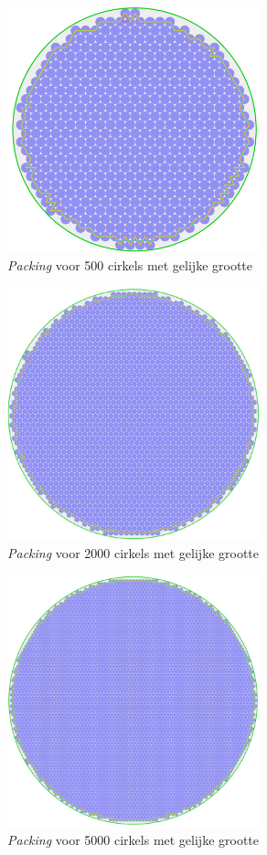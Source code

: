 \documentclass[12pt,a4paper,oneside]{book}
\begin{document}
\begin{figure}
  \centering
  \includegraphics[width=0.65\textwidth]{packing-even-groot-500.png}
  \caption{\textit{Packing} voor 500 cirkels met gelijke grootte}
\end{figure}

\begin{figure}
  \centering
  \includegraphics[width=0.65\textwidth]{packing-even-groot-2000.png}
  \caption{\textit{Packing} voor 2000 cirkels met gelijke grootte}
\end{figure}

\begin{figure}
  \centering
  \includegraphics[width=0.65\textwidth]{packing-even-groot-5000.png}
  \caption{\textit{Packing} voor 5000 cirkels met gelijke grootte}
\end{figure}
\end{document}
